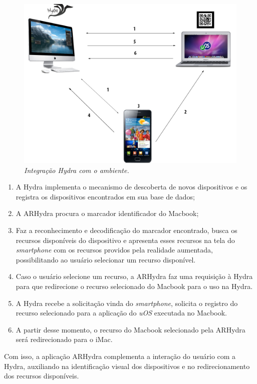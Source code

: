 	\begin{figure}[h] 
		\centering \includegraphics[scale=0.45]{figuras/cap3/integracao_arhydra.png}
		\caption{\textit{Integração Hydra com o ambiente.}}
		\label{fig:arhydra_interacao} 
	\end{figure}
	
	\begin{enumerate}
	  \item A Hydra implementa o mecanismo de descoberta de novos dispositivos e os registra os
	  dispositivos encontrados em sua base de dados;
	  
	  \item A ARHydra procura o marcador identificador do Macbook;
	  
	  \item Faz a reconhecimento e decodificação do marcador encontrado, busca os recursos disponíveis
	  do dispositivo e apresenta esses recursos na tela do \textit{smartphone} com os recursos
	  providos pela realidade aumentada, possibilitando ao usuário selecionar um recurso disponível.
	  
	  \item Caso o usuário selecione um recurso, a ARHydra faz uma requisição à Hydra para que
	  redirecione o recurso selecionado do Macbook para o uso na Hydra.
	  
	  \item A Hydra recebe a solicitação vinda do \textit{smartphone}, solicita o registro do
	  recurso selecionado para a aplicação do \textit{uOS} executada no Macbook.
	  
	  \item A partir desse momento, o recurso do Macbook selecionado pela ARHydra será redirecionado
	  para o iMac.
	\end{enumerate}

	Com isso, a aplicação ARHydra complementa a interação do usuário com a Hydra, auxiliando na
	identificação visual dos dispositivos e no redirecionamento dos recursos disponíveis. 
 	

	
